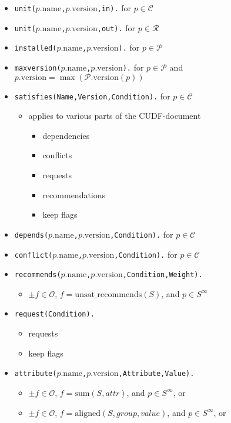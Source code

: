 \documentclass[a4paper,english]{article}
\newcommand{\universe}{\mathcal{P}}
\newcommand{\closure}{\mathcal{C}}
\newcommand{\removed}{\mathcal{R}}
\newcommand{\optimization}{\mathcal{O}}
\newcommand{\name}{\mathrm{name}}
\newcommand{\version}{\mathrm{version}}
\newcommand{\funsatrecom}{\mathrm{unsat\_recommends}}
\newcommand{\fsum}{\mathrm{sum}}
\newcommand{\faligned}{\mathrm{aligned}}
\newcommand{\selmax}{S^\infty}
\newcommand{\attr}[1]{\mathit{#1}}
\begin{document}
\begin{itemize}
  \item \texttt{unit($p.\name$,$p.\version$,in).} for $p\in\closure$
  \item \texttt{unit($p.\name$,$p.\version$,out).} for $p\in\removed$
  \item \texttt{installed($p.\name$,$p.\version$).} for $p\in\universe$
  \item \texttt{maxversion($p.\name$,$p.\version$).} for $p\in\universe$ and $p.\version=\max(\universe.\version(p))$
  \item \texttt{satisfies(Name,Version,Condition).} for $p\in\closure$
    \begin{itemize}
      \item applies to various parts of the CUDF-document
        \begin{itemize}
          \item dependencies
          \item conflicts
          \item requests
          \item recommendations
          \item keep flags
        \end{itemize}
    \end{itemize}
  \item \texttt{depends($p.\name$,$p.\version$,Condition).} for $p\in\closure$
  \item \texttt{conflict($p.\name$,$p.\version$,Condition).} for $p\in\closure$
  \item \texttt{recommends($p.\name$,$p.\version$,Condition,Weight).}
    \begin{itemize}
      \item $\pm f\in\optimization$, $f=\funsatrecom(S)$, and $p\in\selmax$
    \end{itemize}
  \item \texttt{request(Condition).}
    \begin{itemize}
      \item requests
      \item keep flags
    \end{itemize}
  \item \texttt{attribute($p.\name$,$p.\version$,Attribute,Value).}
    \begin{itemize}
      \item $\pm f\in\optimization$, $f=\fsum(S,\attr{attr})$, and $p\in\selmax$, or
      \item $\pm f\in\optimization$, $f=\faligned(S,\attr{group},\attr{value})$, and $p\in\selmax$, or

\end{itemize}
\end{itemize}
\end{document}
